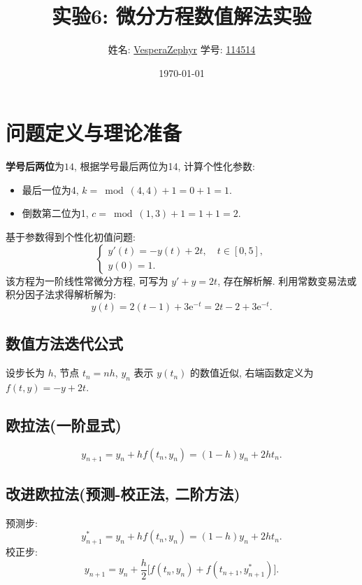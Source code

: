 \documentclass[12pt,a4paper]{ctexart}
\title{\textbf{实验6: 微分方程数值解法实验}}
\author{姓名: \underline{VesperaZephyr} \quad 学号: \underline{114514}}
\date{\today}
\newcommand{\myS}{14}
\begin{document}
\maketitle
\tableofcontents
\newpage

\section{问题定义与理论准备}
\textbf{学号后两位}为$\myS$, 根据学号最后两位为14, 计算个性化参数: 
\begin{itemize}
    \item 最后一位为4, $k = \bmod(4, 4) + 1 = 0 + 1 = 1$. 
    \item 倒数第二位为1, $c = \bmod(1, 3) + 1 = 1 + 1 = 2$. 
\end{itemize}
基于参数得到个性化初值问题: 
\begin{equation}
    \begin{cases}
        y'(t) = -y(t) + 2t, \quad t \in [0, 5], \\[2pt]
        y(0) = 1.
    \end{cases}
    \label{eq:ode}
\end{equation}
该方程为一阶线性常微分方程, 可写为 $y' + y = 2t$, 存在解析解. 利用常数变易法或积分因子法求得解析解为: 
\begin{equation}
    y(t) = 2(t - 1) + 3\mathrm{e}^{-t} = 2t - 2 + 3\mathrm{e}^{-t}.
    \label{eq:exact}
\end{equation}

\subsection{数值方法迭代公式}
设步长为 $h$, 节点 $t_n = nh$, $y_n$ 表示 $y(t_n)$ 的数值近似, 右端函数定义为 $f(t, y) = -y + 2t$. 

\subsection*{欧拉法(一阶显式)}
\begin{equation}
    y_{n+1} = y_n + h f(t_n, y_n) = (1 - h) y_n + 2h t_n.
    \label{eq:euler}
\end{equation}

\subsection*{改进欧拉法(预测-校正法, 二阶方法)}
预测步: 
\begin{equation}
    y^*_{n+1} = y_n + h f(t_n, y_n) = (1 - h) y_n + 2h t_n.
\end{equation}
校正步: 
\begin{equation}
    y_{n+1} = y_n + \frac{h}{2} \bigl[ f(t_n, y_n) + f(t_{n+1}, y^*_{n+1}) \bigr].
    \label{eq:improved_euler}
\end{equation}
\end{document}
